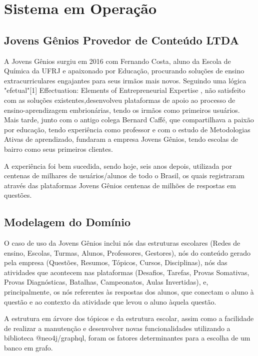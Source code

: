 \chapter{Sistema em Operação}
\label{chap5}


\section{Jovens Gênios Provedor de Conteúdo LTDA}

A Jovens Gênios surgiu em 2016 com Fernando Costa, aluno da Escola de Química da UFRJ e apaixonado por Educação, procurando soluções de ensino extracurriculares engajantes para seus irmãos mais novos. Seguindo uma lógica "efetual"[1] 
Effectuation: Elements of Entrepreneurial Expertise
, não satisfeito com as soluções existentes,desenvolveu plataformas de apoio ao processo de ensino-aprendizagem embrionárias, tendo os irmãos como primeiros usuários.
Mais tarde, junto com o antigo colega Bernard Caffé, que compartilhava a paixão por educação, tendo experiência como professor e com o estudo de Metodologias Ativas de aprendizado, fundaram a empresa Jovens Gênios, tendo escolas de bairro como seus primeiros clientes.

A experiência foi bem sucedida, sendo hoje, seis anos depois, utilizada por centenas de milhares de usuários/alunos de todo o Brasil, os quais registraram através das plataformas Jovens Gênios centenas de milhões de respostas em questões.

\section{Modelagem do Domínio}

O caso de uso da Jovens Gênios inclui nós das estruturas escolares (Redes de ensino, Escolas, Turmas, Alunos, Professores, Gestores), nós do conteúdo gerado pela empresa (Questões, Resumos, Tópicos, Cursos, Disciplinas), nós das atividades que acontecem nas plataformas (Desafios, Tarefas, Provas Somativas, Provas Diagnósticas, Batalhas, Campeonatos, Aulas Invertidas), e, principalmente, os nós referentes às respostas dos alunos, que conectam o aluno à questão e ao contexto da atividade que levou o aluno àquela questão.

A estrutura em árvore dos tópicos e da estrutura escolar, assim como a facilidade de realizar a manutenção e desenvolver novas funcionalidades utilizando a biblioteca @neo4j/graphql, foram os fatores determinantes para a escolha de um banco em grafo.

